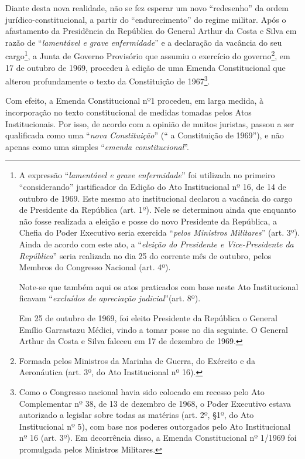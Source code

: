 Diante desta nova realidade, não se fez esperar um novo ``redesenho'' da
ordem jurídico-constitucional, a partir do ``endurecimento'' do regime
militar. Após o afastamento da Presidência da República do General
Arthur da Costa e Silva em razão de ``\emph{lamentável e grave
enfermidade}'' e a declaração da vacância do seu cargo\footnote{A
  expressão ``\emph{lamentável e grave enfermidade}'' foi utilizada no
  primeiro ``considerando'' justificador da Edição do Ato Institucional
  nº 16, de 14 de outubro de 1969. Este mesmo ato institucional declarou
  a vacância do cargo de Presidente da República (art. 1º). Nele se
  determinou ainda que enquanto não fosse realizada a eleição e posse do
  novo Presidente da República, a Chefia do Poder Executivo seria
  exercida ``\emph{pelos Ministros Militares}'' (art. 3º). Ainda de
  acordo com este ato, a ``\emph{eleição do Presidente e Vice-Presidente
  da República}'' seria realizada no dia 25 do corrente mês de outubro,
  pelos Membros do Congresso Nacional (art. 4º).

  Note-se que também aqui os atos praticados com base neste Ato
  Institucional ficavam ``\emph{excluídos de apreciação judicial}''(art.
  8º).

  Em 25 de outubro de 1969, foi eleito Presidente da República o General
  Emílio Garrastazu Médici, vindo a tomar posse no dia seguinte. O
  General Arthur da Costa e Silva faleceu em 17 de dezembro de 1969.}, a
Junta de Governo Provisório que assumiu o exercício do governo\footnote{Formada
  pelos Ministros da Marinha de Guerra, do Exército e da Aeronáutica
  (art. 3º, do Ato Institucional nº 16).}, em 17 de outubro de 1969,
procedeu à edição de uma Emenda Constitucional que alterou profundamente
o texto da Constituição de 1967\footnote{Como o Congresso nacional havia
  sido colocado em recesso pelo Ato Complementar nº 38, de 13 de
  dezembro de 1968, o Poder Executivo estava autorizado a legislar sobre
  todas as matérias (art. 2º, §1º, do Ato Institucional nº 5), com base
  nos poderes outorgados pelo Ato Institucional nº 16 (art. 3º). Em
  decorrência disso, a Emenda Constitucional nº 1/1969 foi promulgada
  pelos Ministros Militares.}.

Com efeito, a Emenda Constitucional nº1 procedeu, em larga medida, à
incorporação no texto constitucional de medidas tomadas pelos Atos
Institucionais. Por isso, de acordo com a opinião de muitos juristas,
passou a ser qualificada como uma ``\emph{nova Constituição}'' (`` a
Constituição de 1969''), e não apenas como uma simples ``\emph{emenda
constitucional}''.

